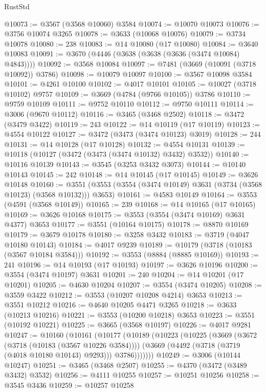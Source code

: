 \begin{lexlean}{RustStd}
\begin{coremodule}
@10073 := @3567 (@3568 @10060) @3584
@10074 := @10070 @10073
@10076 := @3756 @10074 @3265
@10078 := @3633 (@10068 @10076)
@10079 := @3734 @10078
@10080 := 238
@10083 := @14 @10080 (@17 @10080)
@10084 := @3640 @10083
@10091 := @3670 (@4446 (@3638 (@3638 (@3636 (@3474 @10084) @4843))))
@10092 := @3568 @10084
@10097 := @7481 (@3669 (@10091 (@3718 @10092)) @3786)
@10098 := @10079 @10097
@10100 := @3567 @10098 @3584
@10101 := @4261 @10100
@10102 := @4017 @10101
@10105 := @10027 (@3718 @10102) @9757
@10109 := @3669 (@4784 (@9766 @10105)) @3786
@10110 := @9759 @10109
@10111 := @9752 @10110
@10112 := @9750 @10111
@10114 := @3006 (@9670 @10112)
@10116 := @3465 (@3468 @2502)
@10118 := @3472 (@3479 @3422)
@10119 := 243
@10122 := @14 @10119 (@17 @10119)
@10123 := @4554 @10122
@10127 := @3472 (@3473 (@3474 @10123) @3019)
@10128 := 244
@10131 := @14 @10128 (@17 @10128)
@10132 := @4554 @10131
@10139 := @10118 (@10127 (@3472 (@3473 (@3474 @10132) @3432) @3532))
@10140 := @10116 @10139
@10143 := @3545 (@3253 @3432 @3073)
@10144 := @10140 @10143
@10145 := 242
@10148 := @14 @10145 (@17 @10145)
@10149 := @3626 @10148
@10160 := @3551 (@3553 (@3554 (@3474 @10149) @3631 (@3734 (@3568 @10123) (@3568 @10132))) @3653)
@10161 := @4583 @10149
@10164 := @3553 (@4591 (@3568 @10149))
@10165 := 239
@10168 := @14 @10165 (@17 @10165)
@10169 := @3626 @10168
@10175 := @3553 (@3554 (@3474 @10169) @3631 @4377) @3653
@10177 := @3551 (@10164 @10175)
@10178 := @8870 @10169
@10179 := @3679 @10178
@10180 := @3258 @3432
@10183 := @3719 (@4047 @10180 @10143)
@10184 := @4017 @9239
@10189 := @10179 (@3718 (@10183 (@3567 @10184 @3584)))
@10192 := @3553 (@8884 (@8885 @10169))
@10193 := 241
@10196 := @14 @10193 (@17 @10193)
@10197 := @3626 @10196
@10200 := @3554 (@3474 @10197) @3631
@10201 := 240
@10204 := @14 @10201 (@17 @10201)
@10205 := @4630 @10204
@10207 := @3554 (@3474 @10205)
@10208 := @3559 @3422
@10212 := @3553 (@10207 @10208 @4214) @3653
@10213 := @3551 @10212
@10216 := @4640 @10205 @4471 @3265
@10218 := @3633 (@10213 @10216)
@10221 := @3553 (@10200 @10218) @3653
@10223 := @3551 (@10192 @10221)
@10225 := @3665 (@3568 @10197)
@10226 := @4017 @9281
@10247 := @10160
    (@10161
      (@10177
        (@10189
          (@10223
            (@10225
              (@3669
                (@3672 (@3718 (@10183 (@3567 @10226 @3584))))
                (@3669 (@4492 (@3718 (@3719 (@4018 @10180 @10143) @9293))) @3786)))))))
@10249 := @3006 (@10144 @10247)
@10251 := @3465 (@3468 @2507)
@10255 := @4370 (@3472 (@3489 @3432) @3532)
@10256 := @4111 @10255
@10257 := @10251 @10256
@10258 := @3545 @3436
@10259 := @10257 @10258

\end{coremodule}
\end{lexlean}
